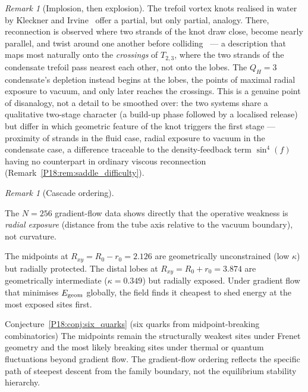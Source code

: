 \documentclass[11pt,a4paper]{article}
\theoremstyle{definition}\newtheorem{definition}[theorem]{Definition}
\theoremstyle{remark}
\newtheorem{remark}[theorem]{Remark}
\newcommand{\QH}{Q_H}
\begin{document}
\begin{remark}[Implosion, then explosion]
The trefoil vortex knots realised in water by Kleckner and
Irvine~\cite{Kleckner2013} offer a partial, but only partial,
analogy.  There, reconnection is observed where two strands of the
knot draw close, become nearly parallel, and twist around one another
before colliding~\cite{Kleckner2013} --- a description that maps most
naturally onto the \emph{crossings} of $T_{2,3}$, where the two
strands of the condensate trefoil pass nearest each other, not onto
the lobes.  The $\QH=3$ condensate's depletion instead begins at the
lobes, the points of maximal radial exposure to vacuum, and only later
reaches the crossings.  This is a genuine point of disanalogy, not a
detail to be smoothed over: the two systems share a qualitative
two-stage character (a build-up phase followed by a localised release)
but differ in which geometric feature of the knot triggers the first
stage --- proximity of strands in the fluid case, radial exposure to
vacuum in the condensate case, a difference traceable to the
density-feedback term $\sin^4(f)$ having no counterpart in ordinary
viscous reconnection (Remark~\ref{P18:rem:saddle_difficulty}).
\end{remark}

\begin{remark}[Cascade ordering]
\label{P18:rem:cascade_ordering}

The $N=256$ gradient-flow data shows directly that the operative
weakness is \emph{radial exposure} (distance from the tube axis
relative to the vacuum boundary), not curvature.

The midpoints at $R_{xy}=R_0-r_0=2.126$ are geometrically unconstrained
(low $\kappa$) but radially protected.  The distal lobes at
$R_{xy}=R_0+r_0=3.874$ are geometrically intermediate ($\kappa=0.349$)
but radially exposed.  Under gradient flow that minimises $E_{\rm geom}$
globally, the field finds it cheapest to shed energy at the most exposed
sites first.

Conjecture~\ref{P18:conj:six_quarks} (six quarks from midpoint-breaking
combinatorics) The midpoints remain the structurally weakest sites under
Frenet geometry and the most likely breaking sites under thermal or quantum
fluctuations beyond gradient flow. The gradient-flow ordering reflects
the specific path of steepest descent from the family boundary, not the
equilibrium stability hierarchy.
\end{remark}
\end{document}
